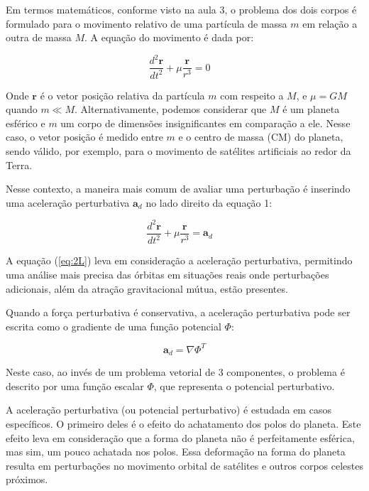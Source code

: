 \par Em termos matemáticos, conforme visto na aula 3, o problema dos dois corpos é formulado para o movimento relativo de uma partícula de massa $m$ em relação a outra de massa $M$. A equação do movimento é dada por:

\begin{equation}
\frac{d^2\mathbf{r}}{dt^2}+\mu\frac{\mathbf{r}}{r^3}=0 \quad 
\label{eq:1L}
\end{equation}

\par Onde $\mathbf{r}$ é o vetor posição relativa da partícula $m$ com respeito a $M$, e $\mu = GM$ quando $m \ll M$. Alternativamente, podemos considerar que $M$ é um planeta esférico e $m$ um corpo de dimensões insignificantes em comparação a ele. Nesse caso, o vetor posição é medido entre $m$ e o centro de massa (CM) do planeta, sendo válido, por exemplo, para o movimento de satélites artificiais ao redor da Terra.

\par Nesse contexto, a maneira mais comum de avaliar uma perturbação é inserindo uma aceleração perturbativa $\mathbf{a}_d$ no lado direito da equação 1:

\begin{equation}
\frac{d^2\mathbf{r}}{dt^2}+\mu\frac{\mathbf{r}}{r^3}=\mathbf{a}_d \quad 
\label{eq:2L}
\end{equation}

\par A equação (\ref{eq:2L}) leva em consideração a aceleração perturbativa, permitindo uma análise mais precisa das órbitas em situações reais onde perturbações adicionais, além da atração gravitacional mútua, estão presentes.

\par Quando a força perturbativa é conservativa, a aceleração perturbativa pode ser escrita como o gradiente de uma função potencial $\Phi$:

\begin{equation}
\mathbf{a}_d = \nabla\Phi^T
\label{eq:3L}
\end{equation}

\par Neste caso, ao invés de um problema vetorial de 3 componentes, o problema é descrito por uma função escalar $\Phi$, que representa o potencial perturbativo.

\par A aceleração perturbativa (ou potencial perturbativo) é estudada em casos específicos. O primeiro deles é o efeito do achatamento dos polos do planeta. Este efeito leva em consideração que a forma do planeta não é perfeitamente esférica, mas sim, um pouco achatada nos polos. Essa deformação na forma do planeta resulta em perturbações no movimento orbital de satélites e outros corpos celestes próximos.

